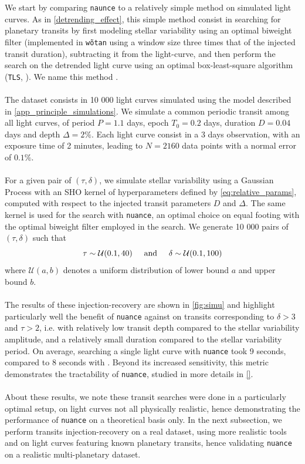 \documentclass{aastex631}
\newcommand{\nuance}{\texttt{nuance}}
\begin{document}
We start by comparing \texttt{naunce} to a relatively simple method on simulated light curves. As in \autoref{detrending_effect}, this simple method consist in searching for planetary transits by first modeling stellar variability using an optimal biweight filter (implemented in \texttt{wõtan} \citep{wotan} using a window size three times that of the injected transit duration), subtracting it from the light-curve, and then perform the search on the detrended light curve using an optimal box-least-square algorithm (\texttt{TLS}, \citealt{tls}). We name this method \wtls{}.
\\\\
The dataset consists in 10 000 light curves simulated using the model described in \autoref{app_principle_simulations}. We simulate a common periodic transit among all light curves, of period $P=1.1$ days, epoch $T_0=0.2$ days, duration $D=0.04$ days and depth $\Delta=2\%$. Each light curve consist in a 3 days observation, with an exposure time of 2 minutes, leading to $N=2160$ data points with a normal error of $0.1\%$.
\\\\
For a given pair of $(\tau, \delta)$, we simulate stellar variability using a Gaussian Process with an SHO kernel of hyperparameters defined by \autoref{eq:relative_params}, computed with respect to the injected transit parameters $D$ and $\Delta$. The same kernel is used for the search with \texttt{nuance}, an optimal choice on equal footing with the optimal biweight filter employed in the \wtls{} search. We generate 10 000 pairs of $(\tau, \delta)$ such that
$$\tau \sim \mathcal{U}(0.1, 40)\hspace{0.5cm}\text{and}\hspace{0.5cm} \delta \sim \mathcal{U}(0.1, 100)$$
where $\mathcal{U}(a, b)$ denotes a uniform distribution of lower bound $a$ and upper bound $b$.
\\\\
The results of these injection-recovery are shown in \autoref{fig:simu} and highlight particularly well the benefit of \nuance{} against \wtls{} on transits corresponding to $\delta > 3$ and $\tau > 2$, i.e. with relatively low transit depth compared to the stellar variability amplitude, and a relatively small duration compared to the stellar variability period. On average, searching a single light curve with \nuance{} took 9 seconds, compared to 8 seconds with \wtls{}. Beyond its increased sensitivity, this metric demonstrates the tractability of \nuance{}, studied in more details in \autoref{}.
\\\\
About these results, we note these transit searches were done in a particularly optimal setup, on light curves not all physically realistic, hence demonstrating the performance of \nuance{} on a theoretical basis only. In the next subsection, we perform transits injection-recovery on a real dataset, using more realistic tools and on light curves featuring known planetary transits, hence validating \nuance{} on a realistic multi-planetary dataset.
\end{document}
